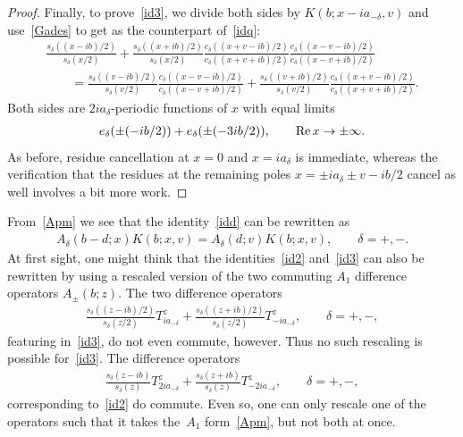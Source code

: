 \documentclass[11pt]{article}
\numberwithin{equation}{section}
\newcommand{\de}{\delta}
\newcommand{\re}{{\rm Re}\, }
\begin{document}
\begin{proof}
Finally, to prove~\eqref{id3}, we divide both sides by
$K(b;x-ia_{-\de},v)$ and use~\eqref{Gades} to get as the counterpart of~\eqref{idq}:
\begin{gather}
   \frac{s_{\de}((x-ib)/2)}{s_{\de}(x/2)}+\frac{s_{\de}((x+ib)/2)}{s_{\de}(x/2)}\frac{c_{\de}((x+ v-ib)/2)}{c_{\de}((x+ v+ib)/2)}\frac{c_{\de}((x- v-ib)/2)}{c_{\de}((x- v+ib)/2)}  \nonumber \\
\qquad{} = \frac{s_{\de}((v-ib)/2)}{s_{\de}(v/2)} \frac{c_{\de}((x-v-ib)/2)}{c_{\de}((x-v+ib)/2)} +   \frac{s_{\de}((v+ib)/2)}{s_{\de}(v/2)} \frac{c_{\de}((x+v-ib)/2)}{c_{\de}((x+v+ib)/2)}.
\end{gather}
Both sides are $2ia_{\de}$-periodic functions of $x$ with equal limits
\begin{gather}
e_{\de}(\pm (-ib/2))+e_{\de}(\pm (-3ib/2)),\qquad \re x \to\pm\infty.
\end{gather}
As before, residue cancellation at $x=0$ and $x=ia_{\de}$ is immediate, whereas the verif\/ication that the residues at the remaining poles $x=\pm ia_{\de} \pm v  -ib/2$ cancel as well involves a bit more work.
\end{proof}


From~\eqref{Apm} we see that the identity~\eqref{idd} can be rewritten as
\begin{gather}
A_{\de}(b-d;x)K(b;x,v)=A_{\de}(d;v)K(b;x,v),\qquad \de=+,-.
\end{gather}
At f\/irst sight, one might think that the identities~\eqref{id2} and~\eqref{id3} can also be rewritten by using a rescaled version of the two commuting $A_1$ dif\/ference operators $A_{\pm}(b;z)$. The two dif\/ference operators
\begin{gather}
\frac{s_{\de}((z-ib)/2)}{s_{\de}(z/2)}T^z_{ia_{-\de}} +
\frac{s_{\de}((z+ib)/2)}{s_{\de}(z/2)}T^z_{-ia_{-\de}},\qquad \de=+,-,
\end{gather}
featuring in~\eqref{id3}, do not even commute, however. Thus no such rescaling is possible for~\eqref{id3}. The dif\/ference operators
\begin{gather}
\frac{s_{\de}(z-ib)}{s_{\de}(z)}T^z_{2ia_{-\de}} +
\frac{s_{\de}(z+ib)}{s_{\de}(z)}T^z_{-2ia_{-\de}},\qquad \de=+,-,
\end{gather}
corresponding to~\eqref{id2} do commute. Even so, one can only rescale one of the operators such that it takes the~$A_1$ form~\eqref{Apm}, but not both at once.
\end{document}

